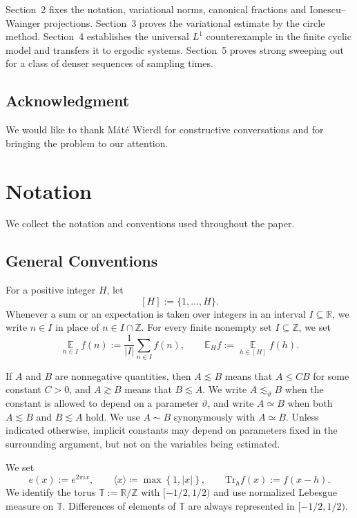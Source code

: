 \documentclass[12pt,leqno]{amsart}
\def\R {\mathbb{R}}
\def\Tr {{\mathrm{Tr}}}
\def\Z {{\mathbb Z}}
\newcommand{\TT}{\mathbb{ T} }
\newcounter{counter}
\newcounter{counter2}
\numberwithin{equation}{section}
\numberwithin{counter2}{section}
\theoremstyle{definition}
\theoremstyle{plain}
\newcommand{\EE}{\mathbb{E}}
\begin{document}
Section~2 fixes the notation, variational norms, canonical fractions and
Ionescu--Wainger projections.  Section~3 proves the variational estimate by the
circle method.  Section~4 establishes the universal $L^1$ counterexample in
the finite cyclic model and transfers it to ergodic systems.  Section~5 proves
strong sweeping out for a class of denser sequences of sampling times.
	\label{s:methodsandstructure
}



\subsection{Acknowledgment}  
We would like to thank Máté Wierdl for constructive conversations and for
bringing the problem to our attention. 




\section{Notation}

We collect the notation and conventions used throughout the paper.

\subsection{General Conventions}

For a positive integer $H$, let
\[
[H]:=\{1,\ldots,H\}.
\]
Whenever a sum or an expectation is taken over integers in an interval $I\subseteq\R$, we write $n\in I$ in place of $n\in I\cap\Z$. For every finite nonempty set $I\subseteq\Z$, we set
\[
\mathop{\EE}\limits_{n\in I} f(n)
:=\frac{1}{|I|}\sum_{n\in I}f(n),
\qquad
\EE_H f:=\mathop{\EE}\limits_{h\in[H]}f(h).
\]



If $A$ and $B$ are nonnegative quantities, then $A\lesssim B$ means that $A\leq CB$ for some constant $C>0$, and $A\gtrsim B$ means that $B\lesssim A$. We write $A\lesssim_{\vartheta}B$ when the constant is allowed to depend on a parameter $\vartheta$, and write $A\simeq B$ when both $A\lesssim B$ and $B\lesssim A$ hold. We use $A\sim B$ synonymously with $A\simeq B$. Unless indicated otherwise, implicit constants may depend on parameters fixed in the surrounding argument, but not on the variables being estimated.

We set
\[
e(x):=e^{2\pi i x},
\qquad
\langle x\rangle \coloneqq \max \left\{1,|x| \right\},
\qquad
\Tr_h f(x):=f(x-h).
\]
We identify the torus $\TT:=\R/\Z$ with $[-1/2,1/2)$ and use normalized Lebesgue measure on $\TT$. Differences of elements of $\TT$ are always represented in $[-1/2,1/2)$.
\end{document}
